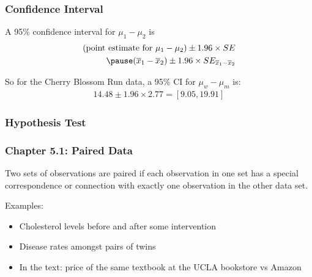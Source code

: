 \documentclass[slides]{beamer}
\newcommand{\blue}[1]{\textcolor{blue2}{#1}}
\newcommand{\xbar}{\overline{x}}
\begin{document}
\begin{frame}[fragile]
\frametitle{Confidence Interval}

A 95\% confidence interval for $\mu_1 - \mu_2$ is
\begin{eqnarray*}
(\mbox{point estimate for } \mu_1 - \mu_2) \pm 1.96 \times SE\\
\pause(\xbar_1 - \xbar_2) \pm 1.96 \times SE_{\xbar_1 - \xbar_2}
\end{eqnarray*}

\pause So for the Cherry Blossom Run data, a 95\% CI for $\mu_w - \mu_m$ is:
\begin{eqnarray*}
14.48 \pm 1.96 \times 2.77 =  [9.05, 19.91]
\end{eqnarray*}

\end{frame}


\begin{frame}[fragile]
\frametitle{Hypothesis Test}



\end{frame}


\begin{frame}[fragile]
\frametitle{Chapter 5.1: Paired Data}
Two sets of observations are \blue{paired} if each observation in one set has a special correspondence or connection with exactly one observation in the other data set.

\vspace{0.25cm} 

\pause Examples:

\begin{itemize}
\item Cholesterol levels before and after some intervention
\pause \item Disease rates amongst pairs of twins
\pause \item In the text:  price of the same textbook at the UCLA bookstore vs Amazon
\end{itemize}

\end{frame}
\end{document}
